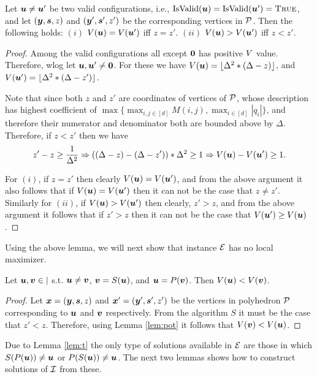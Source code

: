 \begin{lemma}\label{lem:pot}
Let $\uu \neq \uu'$ be two valid configurations, i.e.,
	$\isvalid(\uu)=\isvalid(\uu')=\True$, and let $(\yy,\ps,z)$ and $(\yy',\ps',z')$
	be the corresponding vertices in $\CPol$. Then the following holds: $(i)$
	$\pot(\uu)=\pot(\uu')$ iff $z=z'$. $(ii)$ $\pot(\uu)>\pot(\uu')$ iff $z<z'$.
\end{lemma}
\begin{proof}
Among the valid configurations all except $\zeros$ has positive $\pot$ value. Therefore, wlog let $\uu,\uu'\neq \zeros$. For these we have $\pot(\uu)=\lfloor \Delta^2*(\Delta -z)\rfloor$, and $\pot(\uu')=\lfloor \Delta^2*(\Delta -z')\rfloor$. 

Note that since both $z$ and $z'$ are coordinates of vertices of $\CPol$, whose description has highest coefficient of $\max\{\max_{i,j\in [d]} M(i,j),\max_{i\in [d]} |q_i|\}$, and therefore their numerator and denominator both are bounded above by $\Delta$. Therefore, if $z< z'$ then we have 
\[
z'-z\ge \frac{1}{\Delta^2} \Rightarrow ((\Delta-z) - (\Delta - z'))*\Delta^2 \ge 1 \Rightarrow \pot(\uu)-\pot(\uu') \ge 1.
\]

For $(i)$, if $z=z'$ then clearly $\pot(\uu)=\pot(\uu')$, and from the above argument it also follows that if $\pot(\uu)= \pot(\uu')$ then it can not be the case that $z\neq z'$. Similarly for $(ii)$, if $\pot(\uu)>\pot(\uu')$ then clearly, $z'>z$, and from the above argument it follows that if $z'>z$ then it can not be the case that $\pot(\uu')\ge \pot(\uu)$. 
\end{proof}

Using the above lemma, we will next show that instance $\CE$ has no local maximizer. 

\begin{lemma}\label{lem:t}
Let $\uu,\vv \in \vert$ s.t. $\uu\neq \vv$, $\vv=S(\uu)$, and $\uu=P(\vv)$. Then $\pot(\uu)< \pot(\vv)$.
\end{lemma}
\begin{proof}
Let $\xx=(\yy,\ps,z)$ and $\xx'=(\yy',\ps',z')$ be the vertices in polyhedron $\CPol$ corresponding to $\uu$ and $\vv$ respectively. From the algorithm $S$ it must be the case that $z'<z$. Therefore, using Lemma \ref{lem:pot} it follows that $\pot(\vv)<\pot(\uu)$.
\end{proof}

Due to Lemma \ref{lem:t} the only type of solutions available in $\CE$ are those in which $S(P(\uu))\neq \uu$ or $P(S(\uu))\neq \uu$. The next two lemmas shows how to construct solutions of $\CI$ from these. 

